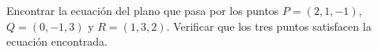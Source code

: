 Encontrar la ecuación del plano que pasa por los puntos $P = (2, 1, -1)$, $Q = (0, -1, 3)$ y $R = (1, 3, 2)$. Verificar que los tres puntos satisfacen la ecuación encontrada.